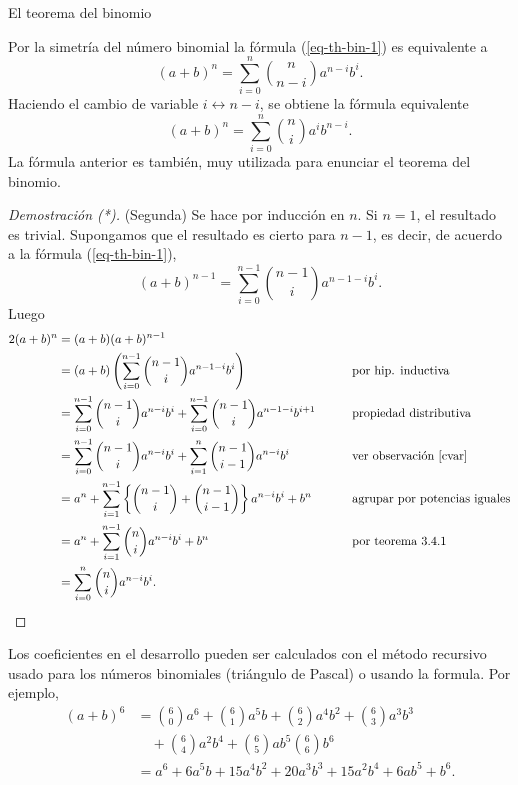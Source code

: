 \begin{section}{El teorema del binomio}
\begin{observacion}
	Por la simetría del número binomial la  fórmula (\ref{eq-th-bin-1}) es equivalente a 
	\begin{equation*}
	(a+b)^n= \sum_{i=0}^{n}\binom{n}{n-i} a^{n-i}b^i.
	\end{equation*}
	Haciendo  el cambio de variable $i \leftrightarrow n-i$, se obtiene la fórmula equivalente
	\begin{equation*}\label{eq-th-bin-2}
	(a+b)^n= \sum_{i=0}^{n}\binom{n}{i} a^ib^{n-i}.
	\end{equation*}
	La fórmula anterior es también, muy utilizada para enunciar el teorema del binomio.
\end{observacion}



\begin{proof}[Demostración (*)](Segunda) Se hace por inducción en $n$. Si
$n=1$, el resultado es trivial. Supongamos que el resultado es
cierto para $n-1$, es decir,  de acuerdo  a la fórmula (\ref{eq-th-bin-1}),
$$
(a+b)^{n-1}=\sum_{i=0}^{n-1} \binom{n-1}{i}a ^{n-1-i}b^{i}.
$$
Luego
\begin{alignat*}2
(a+b)^n&= (a+b)(a+b)^{n-1}&& \\
& = (a+b)\left(\sum_{i=0}^{n-1} \binom{n-1}{i}a ^{n-1-i}b^{i}\right)&&\qquad \text{por hip. inductiva} \\
&=\sum_{i=0}^{n-1} \binom{n-1}{i}a ^{n-i}b^{i}+\sum_{i=0}^{n-1} \binom{n-1}{i}a ^{n-1-i}b^{i+1}&& \qquad \text{propiedad distributiva}\\
&=\sum_{i=0}^{n-1} \binom{n-1}{i}a ^{n-i}b^{i}+\sum_{i=1}^{n} \binom{n-1}{i-1}a ^{n-i}b^{i}&& \qquad \text{ver observación \ref{cvar}}\\
&= a^n + \sum_{i=1}^{n-1}\left\{ \binom{n-1}{i}+\binom{n-1}{i-1}\right\}a ^{n-i}b^{i}+ b^n && \qquad \text{agrupar por potencias iguales}\\
&= a^n + \sum_{i=1}^{n-1} \binom{n}{i}a ^{n-i}b^{i}+ b^n&&\qquad \text{por teorema 3.4.1} \\
&= \sum_{i=0}^{n} \binom{n}{i}a ^{n-i}b^{i}.&&\text{}
\end{alignat*}
\end{proof}

%

Los coeficientes en el desarrollo pueden ser calculados con el método recursivo usado para los números binomiales (triángulo de Pascal) o usando la formula. Por ejemplo,
\begin{equation*}
	\begin{aligned} (a+b)^6 &= \binom{6}{0} a^6 + \binom{6}{1} a^5 b
	+\binom{6}{2}a^4b^2 +
	\binom{6}{3}a^3b^3 \\
	&\quad + \binom{6}{4}a^2b^4+\binom{6}{5}ab^5\binom{6}{6}b^6 \\
	&=  a^6 + 6 a^5 b +15a^4b^2 + 20a^3b^3 + 15a^2b^4+6ab^5+ b^6.
	\end{aligned}
\end{equation*}



\end{section}
